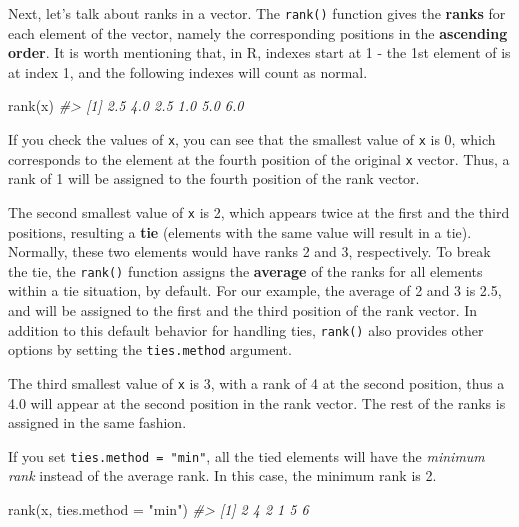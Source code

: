 \documentclass[
]{book}
\newenvironment{Shaded}{\begin{snugshade}}{\end{snugshade}}
\newcommand{\AttributeTok}[1]{\textcolor[rgb]{0.77,0.63,0.00}{#1}}
\newcommand{\CommentTok}[1]{\textcolor[rgb]{0.56,0.35,0.01}{\textit{#1}}}
\newcommand{\FunctionTok}[1]{\textcolor[rgb]{0.00,0.00,0.00}{#1}}
\newcommand{\NormalTok}[1]{#1}
\newcommand{\StringTok}[1]{\textcolor[rgb]{0.31,0.60,0.02}{#1}}
\begin{document}
Next, let's talk about ranks in a vector. The \texttt{rank()} function gives the \textbf{ranks} for each element of the vector, namely the corresponding positions in the \textbf{ascending order}. It is worth mentioning that, in R, indexes start at 1 - the 1st element of is at index 1, and the following indexes will count as normal.

\begin{Shaded}
\begin{Highlighting}[]
\FunctionTok{rank}\NormalTok{(x)}
\CommentTok{\#\textgreater{} [1] 2.5 4.0 2.5 1.0 5.0 6.0}
\end{Highlighting}
\end{Shaded}

If you check the values of \texttt{x}, you can see that the smallest value of \texttt{x} is 0, which corresponds to the element at the fourth position of the original \texttt{x} vector. Thus, a rank of 1 will be assigned to the fourth position of the rank vector.

The second smallest value of \texttt{x} is 2, which appears twice at the first and the third positions, resulting a \textbf{tie} (elements with the same value will result in a tie). Normally, these two elements would have ranks 2 and 3, respectively. To break the tie, the \texttt{rank()} function assigns the \textbf{average} of the ranks for all elements within a tie situation, by default. For our example, the average of 2 and 3 is 2.5, and will be assigned to the first and the third position of the rank vector. In addition to this default behavior for handling ties, \texttt{rank()} also provides other options by setting the \texttt{ties.method} argument.

The third smallest value of \texttt{x} is 3, with a rank of 4 at the second position, thus a 4.0 will appear at the second position in the rank vector. The rest of the ranks is assigned in the same fashion.

If you set \texttt{ties.method\ =\ "min"}, all the tied elements will have the \emph{minimum rank} instead of the average rank. In this case, the minimum rank is 2.

\begin{Shaded}
\begin{Highlighting}[]
\FunctionTok{rank}\NormalTok{(x, }\AttributeTok{ties.method =} \StringTok{"min"}\NormalTok{)}
\CommentTok{\#\textgreater{} [1] 2 4 2 1 5 6}
\end{Highlighting}
\end{Shaded}
\end{document}
